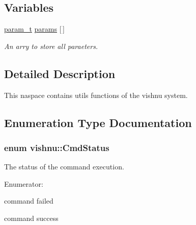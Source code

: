 \subsection*{Variables}
\begin{DoxyCompactItemize}
\item 
\hypertarget{namespacevishnu_a1ca7d1d1baf7cebd2530d93b9f064bd9}{
\hyperlink{structvishnu_1_1param__t}{param\_\-t} \hyperlink{namespacevishnu_a1ca7d1d1baf7cebd2530d93b9f064bd9}{params} \mbox{[}$\,$\mbox{]}}
\label{namespacevishnu_a1ca7d1d1baf7cebd2530d93b9f064bd9}

\begin{DoxyCompactList}\small\item\em An arry to store all paraeters. \item\end{DoxyCompactList}\end{DoxyCompactItemize}


\subsection{Detailed Description}
This naspace contains utils functions of the vishnu system. 

\subsection{Enumeration Type Documentation}
\hypertarget{namespacevishnu_a5513f86dabac3cd717c915498a7679ad}{
\subsubsection[{CmdStatus}]{\setlength{\rightskip}{0pt plus 5cm}enum {\bf vishnu::CmdStatus}}}
\label{namespacevishnu_a5513f86dabac3cd717c915498a7679ad}


The status of the command execution. 

\begin{Desc}
\item[Enumerator: ]\par
\begin{description}
\item[{\em 
\hypertarget{namespacevishnu_a5513f86dabac3cd717c915498a7679adae7dab65b7ae704dfe53ba3db119c0777}{
CMDFAILED}
\label{namespacevishnu_a5513f86dabac3cd717c915498a7679adae7dab65b7ae704dfe53ba3db119c0777}
}]command failed \item[{\em 
\hypertarget{namespacevishnu_a5513f86dabac3cd717c915498a7679ada5a52e3ba3082e971180e246724851e1e}{
CMDSUCCESS}
\label{namespacevishnu_a5513f86dabac3cd717c915498a7679ada5a52e3ba3082e971180e246724851e1e}
}]command success \end{description}
\end{Desc}

